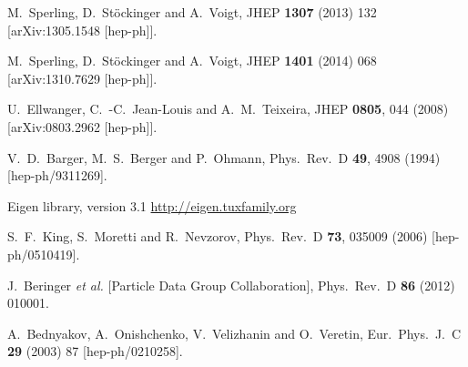 \documentclass[final,3p,11pt,pdflatex]{elsarticle}
\begin{document}
\begin{thebibliography}{100}
  M.~Sperling, D.~Stöckinger and A.~Voigt,
  JHEP {\bf 1307} (2013) 132
  [arXiv:1305.1548 [hep-ph]].

  M.~Sperling, D.~Stöckinger and A.~Voigt,
  JHEP {\bf 1401} (2014) 068
  [arXiv:1310.7629 [hep-ph]].

  U.~Ellwanger, C.~-C.~Jean-Louis and A.~M.~Teixeira,
  JHEP {\bf 0805}, 044 (2008)
  [arXiv:0803.2962 [hep-ph]].


  V.~D.~Barger, M.~S.~Berger and P.~Ohmann,
  Phys.\ Rev.\ D {\bf 49}, 4908 (1994)
  [hep-ph/9311269].

Eigen library, version 3.1 \url{http://eigen.tuxfamily.org}

  S.~F.~King, S.~Moretti and R.~Nevzorov,
  Phys.\ Rev.\ D {\bf 73}, 035009 (2006)
  [hep-ph/0510419].

  J.~Beringer {\it et al.}  [Particle Data Group Collaboration],
  Phys.\ Rev.\ D {\bf 86} (2012) 010001.

  A.~Bednyakov, A.~Onishchenko, V.~Velizhanin and O.~Veretin,
  Eur.\ Phys.\ J.\ C {\bf 29} (2003) 87
  [hep-ph/0210258].


\end{thebibliography}
\end{document}
